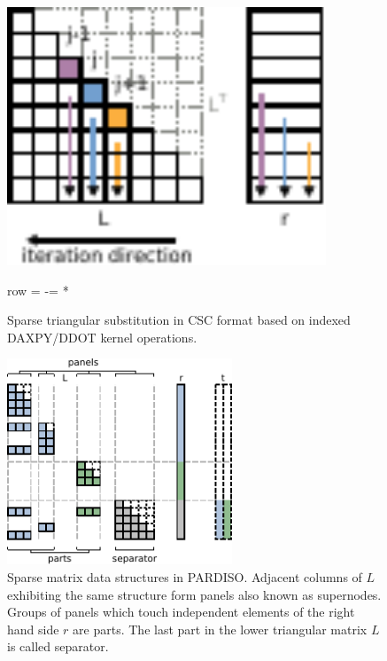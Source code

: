 \begin{figure}[t]
    \centering
    \begin{minipage}{.35\textwidth}
        \centering
        \includegraphics[width=0.85\textwidth,clip=true]{images/backward-small}
    \end{minipage}%
    \begin{minipage}{0.65\textwidth}
        \centering
  \begin{algorithmic}[1]
            \label{algo:bw:cholmod}
                   \State row = \nindx[i]
                   \State \nr[j] -=  \nr[row] * \nlnz[i] 
            \EndFor\label{algo:bw:cholmod:rloop:end}
      \EndFor
    \EndProcedure
  \end{algorithmic}
    \end{minipage}
  \caption{Sparse triangular substitution in CSC format based on indexed DAXPY/DDOT kernel operations.}
  \label{algo:triangular}
\end{figure}


\begin{figure}[t]
  \centering
    \includegraphics[width=0.6\textwidth,clip=true]{images/parts-panels-separator}
  \caption{Sparse matrix data structures in PARDISO. Adjacent columns of $L$ exhibiting the same
structure form panels also known as supernodes. 
Groups of panels which touch independent elements of the right hand side $r$ are
parts. The last part in the lower triangular matrix $L$ is called separator.}
  \label{fig:algo:ds}
\end{figure}



